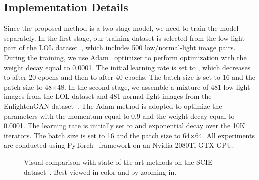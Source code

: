 \documentclass[journal]{IEEEtran}
\begin{document}
\subsection{Implementation Details}
Since the proposed method is a two-stage model, we need to train the model separately. In the first stage, our training dataset is selected from the low-light part of the LOL dataset~\cite {Chen2018Retinex}, which includes 500 low/normal-light image pairs. During the training, we use Adam~\cite{kingma2014adam} optimizer to perform optimization with the weight decay equal to 0.0001. The initial learning rate is set to , which decreases to  after 20 epochs and then to  after 40 epochs. The batch size is set to 16 and the patch size to 48×48. In the second stage, we assemble a mixture of 481 low-light images from the LOL dataset and 481 normal-light images from the EnlightenGAN dataset~\cite{jiang2021enlightengan}. The Adam method is adopted to optimize the parameters with the momentum equal to 0.9 and the weight decay equal to 0.0001. The learning rate is initially set to  and exponential decay over the 10K iterators. The batch size is set to 16 and the patch size to 64×64. All experiments are conducted using PyTorch~\cite{paszke2017automatic} framework on an Nvidia 2080Ti GTX GPU.
\begin{figure*}
    \begin{center}
    \hspace*{-2mm}
    \hspace*{-2mm}
    \hspace*{-2mm}
    \hspace*{-2mm}
    \hspace*{-2mm}
    \hspace*{-2mm}
    \caption{Visual comparison with state-of-the-art methods on the SCIE dataset~\cite{cai2018learning}. Best viewed in color and by zooming in.}
    \label{fig:real}
    \end{center}
\end{figure*}
\end{document}
